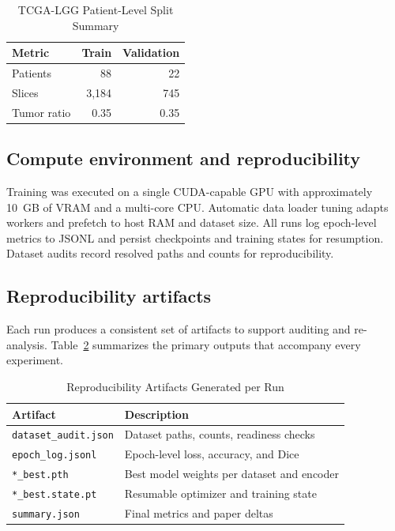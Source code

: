 \documentclass[conference,a4paper]{IEEEtran}
\begin{document}
\begin{table}[t]
\centering
\caption{TCGA-LGG Patient-Level Split Summary}
\label{tab:tcga_split}
\begin{tabular}{l r r}
\toprule
Metric & Train & Validation \\
\midrule
Patients & 88 & 22 \\
Slices & 3,184 & 745 \\
Tumor ratio & 0.35 & 0.35 \\
\bottomrule
\end{tabular}
\end{table}

\subsection{Compute environment and reproducibility}
Training was executed on a single CUDA-capable GPU with approximately \SI{10}{GB} of VRAM and a multi-core CPU. Automatic data loader tuning adapts workers and prefetch to host RAM and dataset size. All runs log epoch-level metrics to JSONL and persist checkpoints and training states for resumption. Dataset audits record resolved paths and counts for reproducibility.

\subsection{Reproducibility artifacts}
Each run produces a consistent set of artifacts to support auditing and re-analysis. Table~\ref{tab:artifacts} summarizes the primary outputs that accompany every experiment.

\begin{table}[t]
\centering
\caption{Reproducibility Artifacts Generated per Run}
\label{tab:artifacts}
\begin{tabular}{l l}
\toprule
Artifact & Description \\
\midrule
\texttt{dataset\_audit.json} & Dataset paths, counts, readiness checks \\
\texttt{epoch\_log.jsonl} & Epoch-level loss, accuracy, and Dice \\
\texttt{*\_best.pth} & Best model weights per dataset and encoder \\
\texttt{*\_best.state.pt} & Resumable optimizer and training state \\
\texttt{summary.json} & Final metrics and paper deltas \\
\bottomrule
\end{tabular}
\end{table}
\end{document}
